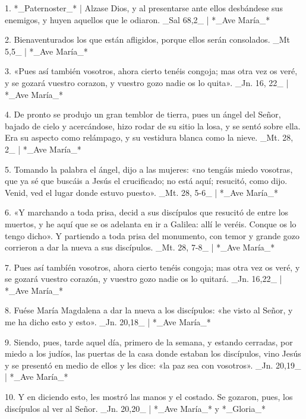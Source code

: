 1. *_Paternoster_* | Alzase Dios, y al presentarse ante ellos desbándese sus enemigos, y huyen aquellos que le odiaron. _Sal 68,2_ | *_Ave María_*

2. Bienaventurados los que están afligidos, porque ellos serán consolados. _Mt 5,5_ | *_Ave María_*

3. «Pues así también vosotros, ahora cierto tenéis congoja; mas otra vez os veré, y se gozará vuestro corazon, y vuestro gozo nadie os lo quita». _Jn. 16, 22_ | *_Ave María_*

4. De pronto se produjo un gran temblor de tierra, pues un ángel del Señor, bajado de cielo y acercándose, hizo rodar de su sitio la losa, y se sentó sobre ella. Era su aspecto como relámpago, y su vestidura blanca como la nieve. _Mt. 28, 2_ | *_Ave María_*

5. Tomando la palabra el ángel, dijo a las mujeres: «no tengáis miedo vosotras, que ya sé que buscáis a Jesús el crucificado; no está aquí; resucitó, como dijo. Venid, ved el lugar donde estuvo puesto». _Mt. 28, 5-6_ | *_Ave María_*

6. «Y marchando a toda prisa, decid a sus discípulos que resucitó de entre los muertos, y he aquí que se os adelanta en ir a Galilea: allí le veréis. Conque os lo tengo dicho». Y partiendo a toda prisa del monumento, con temor y grande gozo corrieron a dar la nueva a sus discípulos. _Mt. 28, 7-8_ | *_Ave María_*

7. Pues así tambíén vosotros, ahora cierto tenéis congoja; mas otra vez os veré, y se gozará vuestro corazón, y vuestro gozo nadie os lo quitará. _Jn. 16,22_ | *_Ave María_*

8. Fuése María Magdalena a dar la nueva a los discípulos: «he visto al Señor, y me ha dicho esto y esto». _Jn. 20,18_ | *_Ave María_*

9. Siendo, pues, tarde aquel día, primero de la semana, y estando cerradas, por miedo a los judíos, las puertas de la casa donde estaban los discípulos, vino Jesús y se presentó en medio de ellos y les dice: «la paz sea con vosotros». _Jn. 20,19_ | *_Ave María_*

10. Y en diciendo esto, les mostró las manos y el costado. Se gozaron, pues, los discípulos al ver al Señor. _Jn. 20,20_ | *_Ave María_* y *_Gloria_*